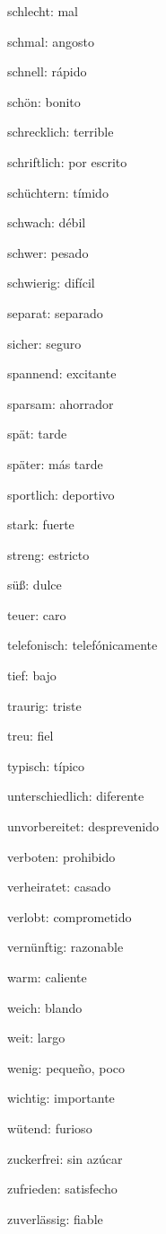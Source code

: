 \begin{multicols}{3}
\begin{myitemize}
\item schlecht: mal
\item schmal: angosto
\item schnell: rápido
\item schön: bonito
\item schrecklich: terrible
\item schriftlich: por escrito
\item schüchtern: tímido
\item schwach: débil
\item schwer: pesado
\item schwierig: difícil
\item separat: separado
\item sicher: seguro
\item spannend: excitante
\item sparsam: ahorrador
\item spät: tarde
\item später: más tarde
\item sportlich: deportivo
\item stark: fuerte
\item streng: estricto
\item süß: dulce
\item teuer: caro
\item telefonisch: telefónicamente
\item tief: bajo
\item traurig: triste
\item treu: fiel
\item typisch: típico
\item unterschiedlich: diferente
\item unvorbereitet: desprevenido
\item verboten: prohibido
\item verheiratet: casado
\item verlobt: comprometido
\item vernünftig: razonable
\item warm: caliente
\item weich: blando
\item weit: largo
\item wenig: pequeño, poco
\item wichtig: importante
\item wütend: furioso
\item zuckerfrei: sin azúcar
\item zufrieden: satisfecho
\item zuverlässig: fiable
\end{myitemize}
\end{multicols}

